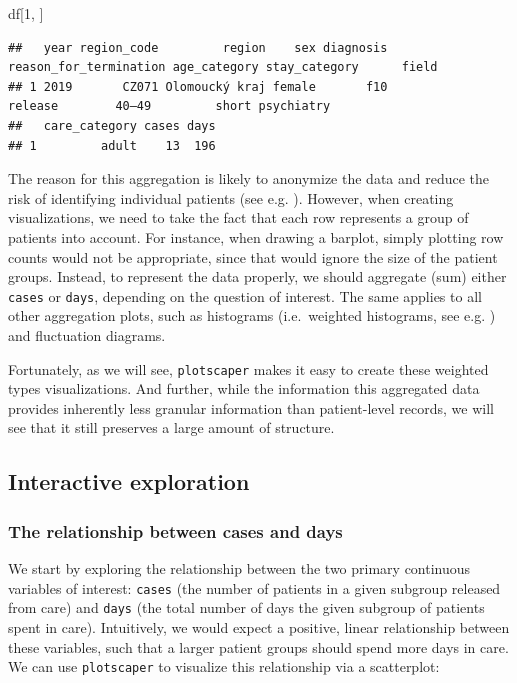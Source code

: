 \documentclass[
]{book}
\newenvironment{Shaded}{\begin{snugshade}}{\end{snugshade}}
\newcommand{\DecValTok}[1]{\textcolor[rgb]{0.00,0.00,0.81}{#1}}
\newcommand{\NormalTok}[1]{#1}
\theoremstyle{definition}
\theoremstyle{definition}
\theoremstyle{definition}
\theoremstyle{definition}
\theoremstyle{remark}
\begin{document}
\begin{Shaded}
\begin{Highlighting}[]
\NormalTok{df[}\DecValTok{1}\NormalTok{, ]}
\end{Highlighting}
\end{Shaded}

\begin{verbatim}
##   year region_code         region    sex diagnosis reason_for_termination age_category stay_category      field
## 1 2019       CZ071 Olomoucký kraj female       f10                release        40–49         short psychiatry
##   care_category cases days
## 1         adult    13  196
\end{verbatim}

The reason for this aggregation is likely to anonymize the data and reduce the risk of identifying individual patients (see e.g. ). However, when creating visualizations, we need to take the fact that each row represents a group of patients into account. For instance, when drawing a barplot, simply plotting row counts would not be appropriate, since that would ignore the size of the patient groups. Instead, to represent the data properly, we should aggregate (sum) either \texttt{cases} or \texttt{days}, depending on the question of interest. The same applies to all other aggregation plots, such as histograms (i.e.~weighted histograms, see e.g. ) and fluctuation diagrams.

Fortunately, as we will see, \texttt{plotscaper} makes it easy to create these weighted types visualizations. And further, while the information this aggregated data provides inherently less granular information than patient-level records, we will see that it still preserves a large amount of structure.

\subsection{Interactive exploration}\label{interactive-exploration}

\subsubsection{The relationship between cases and days}\label{the-relationship-between-cases-and-days}

We start by exploring the relationship between the two primary continuous variables of interest: \texttt{cases} (the number of patients in a given subgroup released from care) and \texttt{days} (the total number of days the given subgroup of patients spent in care). Intuitively, we would expect a positive, linear relationship between these variables, such that a larger patient groups should spend more days in care. We can use \texttt{plotscaper} to visualize this relationship via a scatterplot:
\end{document}
